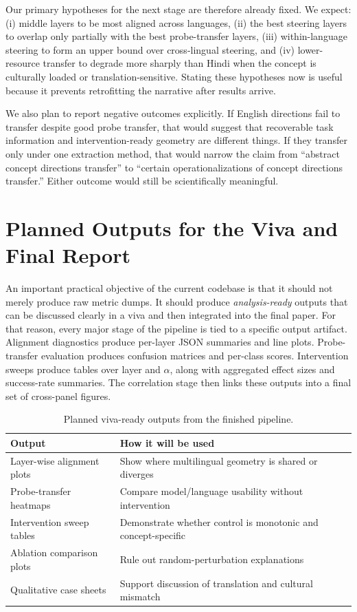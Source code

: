\documentclass[11pt]{article}
\begin{document}
Our primary hypotheses for the next stage are therefore already fixed. We expect: (i) middle layers to be most aligned across languages, (ii) the best steering layers to overlap only partially with the best probe-transfer layers, (iii) within-language steering to form an upper bound over cross-lingual steering, and (iv) lower-resource transfer to degrade more sharply than Hindi when the concept is culturally loaded or translation-sensitive. Stating these hypotheses now is useful because it prevents retrofitting the narrative after results arrive.

We also plan to report negative outcomes explicitly. If English directions fail to transfer despite good probe transfer, that would suggest that recoverable task information and intervention-ready geometry are different things. If they transfer only under one extraction method, that would narrow the claim from ``abstract concept directions transfer'' to ``certain operationalizations of concept directions transfer.'' Either outcome would still be scientifically meaningful.

\section{Planned Outputs for the Viva and Final Report}
An important practical objective of the current codebase is that it should not merely produce raw metric dumps. It should produce \emph{analysis-ready} outputs that can be discussed clearly in a viva and then integrated into the final paper. For that reason, every major stage of the pipeline is tied to a specific output artifact. Alignment diagnostics produce per-layer JSON summaries and line plots. Probe-transfer evaluation produces confusion matrices and per-class scores. Intervention sweeps produce tables over layer and $\alpha$, along with aggregated effect sizes and success-rate summaries. The correlation stage then links these outputs into a final set of cross-panel figures.

\begin{table}[t]
\centering
\small
\begin{tabular}{p{}p{}}
\toprule
\textbf{Output} & \textbf{How it will be used} \\
\midrule
Layer-wise alignment plots & Show where multilingual geometry is shared or diverges \\
Probe-transfer heatmaps & Compare model/language usability without intervention \\
Intervention sweep tables & Demonstrate whether control is monotonic and concept-specific \\
Ablation comparison plots & Rule out random-perturbation explanations \\
Qualitative case sheets & Support discussion of translation and cultural mismatch \\
\bottomrule
\end{tabular}
\caption{Planned viva-ready outputs from the finished pipeline.}
\label{tab:vivaoutputs}
\end{table}
\end{document}
